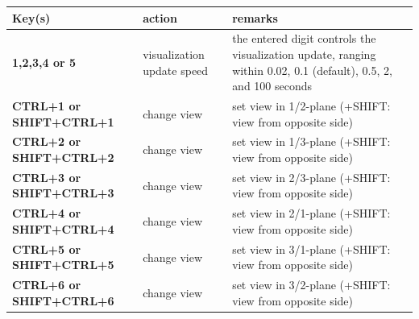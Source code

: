 \documentclass[11pt,a4paper]{book}
\begin{document}
\begin{center}
  \footnotesize
  \begin{longtable}{| p{4cm} | p{4cm} | p{8cm} |} 
	\hline
  \bf Key(s) & action & \bf remarks \\ \hline
  \bf 1,2,3,4 or 5 & visualization update speed & the entered digit controls the visualization update, ranging within 0.02, 0.1 (default), 0.5, 2, and 100 seconds \\ \hline
  \bf CTRL+1 or SHIFT+CTRL+1& change view& set view in 1/2-plane (+SHIFT: view from opposite side) \\ \hline
  \bf CTRL+2 or SHIFT+CTRL+2& change view& set view in 1/3-plane (+SHIFT: view from opposite side) \\ \hline
  \bf CTRL+3 or SHIFT+CTRL+3& change view& set view in 2/3-plane (+SHIFT: view from opposite side) \\ \hline
  \bf CTRL+4 or SHIFT+CTRL+4& change view& set view in 2/1-plane (+SHIFT: view from opposite side) \\ \hline
  \bf CTRL+5 or SHIFT+CTRL+5& change view& set view in 3/1-plane (+SHIFT: view from opposite side) \\ \hline
  \bf CTRL+6 or SHIFT+CTRL+6& change view& set view in 3/2-plane (+SHIFT: view from opposite side) \\ \hline


\end{longtable}
\end{center}
\end{document}
